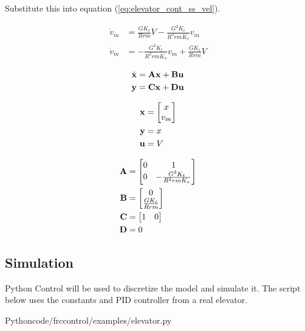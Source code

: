 Substitute this into equation (\ref{eq:elevator_cont_ss_vel}).

\begin{align}
  \dot{v}_m &= \frac{GK_t}{Rrm} V - \frac{G^2 K_t}{R^2 rm K_v} v_m \nonumber \\
  \dot{v}_m &= -\frac{G^2 K_t}{R^2 rm K_v} v_m + \frac{GK_t}{Rrm} V
\end{align}

\begin{align*}
  \dot{\mathbf{x}} &= \mathbf{A} \mathbf{x} + \mathbf{B} \mathbf{u} \\
  \mathbf{y} &= \mathbf{C} \mathbf{x} + \mathbf{D} \mathbf{u}
\end{align*}

\begin{align*}
  \mathbf{x} &=
  \begin{bmatrix}
    x \\
    v_m
  \end{bmatrix} \\
  \mathbf{y} &= x \\
  \mathbf{u} &= V
\end{align*}

\begin{align}
  \mathbf{A} &=
  \begin{bmatrix}
    0 & 1 \\
    0 & -\frac{G^2 K_t}{R^2rmK_v}
  \end{bmatrix} \\
  \mathbf{B} &=
  \begin{bmatrix}
    0 \\
    \frac{GK_t}{Rrm}
  \end{bmatrix} \\
  \mathbf{C} &=
  \begin{bmatrix}
    1 & 0
  \end{bmatrix} \\
  \mathbf{D} &= 0
\end{align}

\subsection{Simulation}

Python Control will be used to discretize the model and simulate it. The script
below uses the constants and PID controller from a real elevator.

\begin{code}{Python}{code/frccontrol/examples/elevator.py}
  \caption{Elevator simulation in Python.}
  \label{lst:elevator_sim}
\end{code}
